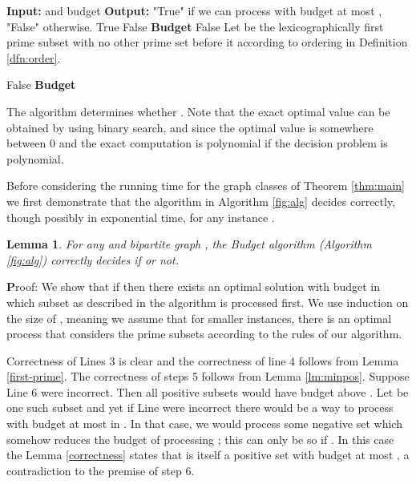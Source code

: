 \documentclass[letterpaper,11pt,abstracton]{scrartcl}
\newcommand{\pf}{{\textbf Proof: }}
\newtheorem{lemma}[theorem]{Lemma}
\begin{document}
\begin{algorithm}[H]
\begin{algorithmic}[1]
\State \textbf{Input:}  and budget \;
\State \textbf{Output:} "True" if we can process  with budget at most , "False" otherwise.\;
\label{Alg-general-firstIF}
 \Return True\;
\EndIf \label{Alg-gnr-end-firstif}
 \label{Alg-general-secondIF}
\Return False\;
\EndIf \label{Alg-gnr-end-secondif}
 \label{Alg-general-thirdIF}
     \Return \textbf{Budget} \;
\EndIf \label{Alg-gnr-end-thirdif}
  \label{Alg-general-fourthIF}
\Return False\;
\EndIf \label{Alg-gnr-end-fourthif}
\State Let  be the lexicographically first prime subset with no other prime set before it according to ordering in Definition \ref{dfn:order}.

 \label{Alg-general-fifthIF}
    \Return False
\Else {}
     \Return \textbf{Budget} \;
\EndIf \label{Alg-gnr-end-fifthif}
\end{algorithmic}
\caption{{\textbf Budget } ( , )}
\label{fig:alg}
\end{algorithm}

The algorithm determines whether . Note that the exact
optimal value can be obtained by using binary search, and since the
optimal value is somewhere between 0 and  the exact computation
is polynomial if the decision problem is polynomial.

Before considering the running time for the graph classes of Theorem \ref{thm:main} we
first demonstrate that the algorithm in Algorithm \ref{fig:alg} decides correctly,
though possibly in exponential time, for any instance .

\begin{lemma}\label{lm:optimal}
  For any  and bipartite graph , the Budget algorithm  (Algorithm \ref{fig:alg}) correctly
  decides if  or not.
\end{lemma}
\pf We show that if  then there exists an optimal solution  with
budget  in which subset  as described in the algorithm is processed
first. We use induction on the size of , meaning we assume that for smaller instances,
there is an optimal process that considers the prime subsets according to the rules of our algorithm.

Correctness of Lines 3 is clear and the correctness of line 4 follows from Lemma \ref{first-prime}.
The correctness of steps 5 follows from Lemma \ref{lm:minpos}. Suppose Line 6 were incorrect. Then
all positive subsets would have budget above . Let  be one such subset and yet if 
Line were incorrect there would be a way to process  with budget at most  in . In that case, we would process some negative set
 which somehow reduces the budget of processing ; this can
only be so if .  In this case the Lemma
\ref{correctness} states that 
is itself a positive set with budget at most , a contradiction to
the premise of step 6.
\end{document}
